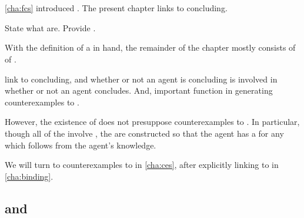 \chapter{}
\label{cha:requs}

\begin{note}
  \autoref{cha:fcs} introduced .
  The present chapter links  to concluding.

  State what  are.
  Provide .
\end{note}

\begin{note}
  With the definition of a \requ{} in hand, the remainder of the chapter mostly consists of  of .

   link  to concluding, and whether or not an agent is concluding is involved in whether or not an agent concludes.
  And, important function in generating counterexamples to \issueConstraint{}.

  However, the existence of  does not presuppose counterexamples to \issueConstraint{}.
  In particular, though all of the  involve , the  are constructed so that the agent has a  for any \ros{} which follows from the agent's knowledge.

  We will turn to counterexamples to \issueConstraint{} in \autoref{cha:ces}, after explicitly linking  to \qWhyV{} in \autoref{cha:binding}.
\end{note}

\section{ and }

